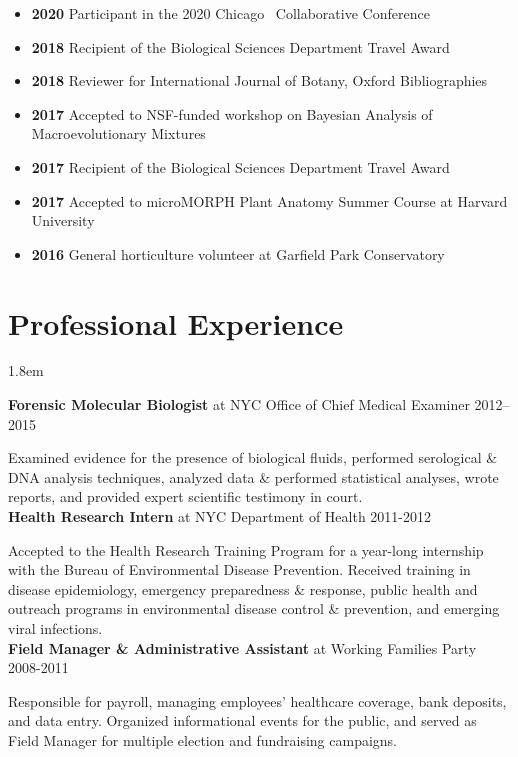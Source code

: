 \documentclass[]{article}
\begin{document}
\begin{itemize}[label=$\mathwitch*$]
\item{\textbf{2020} Participant in the 2020 Chicago \textcolor{light-gray}{\faRProject}\ Collaborative Conference \href{https://chircollab.github.io/}{\faLink}}
\item{\textbf{2018} Recipient of the Biological Sciences Department Travel Award}
\item{\textbf{2018} Reviewer for International Journal of Botany, Oxford Bibliographies}
\item{\textbf{2017} Accepted to NSF-funded workshop on Bayesian Analysis of Macroevolutionary Mixtures \href{http://bamm-project.org/index.html}{\faLink}}
\item{\textbf{2017} Recipient of the Biological Sciences Department Travel Award}
\item{\textbf{2017} Accepted to microMORPH Plant Anatomy Summer Course at Harvard University \href{https://web.archive.org/web/20170922060558/http://arboretum.harvard.edu/tracing-evolution-form-function/"}{\faLink}}
\item{\textbf{2016} General horticulture volunteer at Garfield Park Conservatory \href{https://garfieldconservatory.org/}{\faLink}}
\end{itemize}

\vspace{2mm}
\section{Professional Experience}

\vspace{2mm}
\leftskip 1.8em

\textbf{Forensic Molecular Biologist} at NYC Office of Chief Medical Examiner \hfill 2012--2015
     
Examined evidence for the presence of biological fluids, performed serological \& DNA analysis \linebreak techniques, analyzed data \& performed statistical analyses, wrote reports, and provided expert \linebreak scientific testimony in court.\\
   
\textbf{Health Research Intern} at NYC Department of Health \hfill 2011-2012
     
Accepted to the Health Research Training Program for a year-long internship with the Bureau of \linebreak Environmental Disease Prevention. Received training in disease epidemiology, emergency preparedness \& response, public health and outreach programs in environmental disease control \&  prevention, and emerging viral infections.\\
     
\textbf{Field Manager \& Administrative Assistant} at Working Families Party \hfill 2008-2011
     
Responsible for payroll, managing employees' healthcare coverage, bank deposits, and data entry. \linebreak Organized informational events for the public, and served as Field Manager for multiple election and fundraising campaigns.
\end{document}
